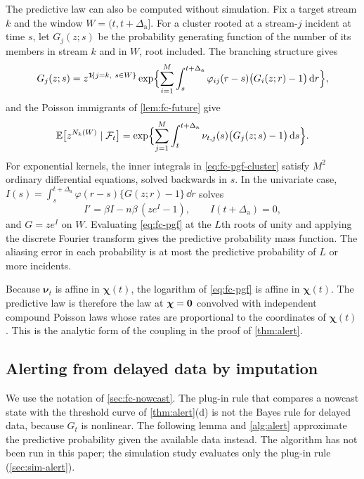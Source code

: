 \begin{remark}\label{rem:fc-pgf}
The predictive law can also be computed without simulation. Fix a target stream $k$
and the window $W=(t,t+\Delta_{\mathrm a}]$. For a cluster rooted at a stream-$j$ incident at time
$s$, let $G_j(z;s)$ be the probability generating function of the number of its members
in stream $k$ and in $W$, root included. The branching structure gives
\begin{equation}\label{eq:fc-pgf-cluster}
  G_j(z;s)=z^{\mathbf{1}\!\left\{j=k,\ s\in W\right\}}\exp\Bigl\{\sum_{i=1}^{M}\int_s^{t+\Delta_{\mathrm a}}\varphi_{ij}(r-s)\bigl(G_i(z;r)-1\bigr)\,\mathrm{d} r\Bigr\},
\end{equation}
and the Poisson immigrants of \cref{lem:fc-future} give
\begin{equation}\label{eq:fc-pgf}
  \mathbb{E}\bigl[z^{N_k(W)}\mid\mathcal{F}_t\bigr]
  =\exp\Bigl\{\sum_{j=1}^{M}\int_t^{t+\Delta_{\mathrm a}}\nu_{t,j}(s)\bigl(G_j(z;s)-1\bigr)\,\mathrm{d} s\Bigr\}.
\end{equation}
For exponential kernels, the inner integrals in \eqref{eq:fc-pgf-cluster} satisfy $M^2$
ordinary differential equations, solved backwards in $s$. In the univariate case,
$I(s)=\int_s^{t+\Delta_{\mathrm a}}\varphi(r-s)\{G(z;r)-1\}\,\dd r$ solves
\[
I'=\beta I-n\beta\,(ze^{I}-1),\qquad I(t+\Delta_{\mathrm a})=0,
\]
and $G=ze^{I}$ on $W$. Evaluating \eqref{eq:fc-pgf} at the $L$th roots of unity and
applying the discrete Fourier transform gives the predictive probability mass function.
The aliasing error in each probability is at most the predictive probability of $L$ or
more incidents.

Because $\bm\nu_t$ is affine in $\bm\chi(t)$, the logarithm of \eqref{eq:fc-pgf} is
affine in $\bm\chi(t)$. The predictive law is therefore the law at $\bm\chi=\mathbf{0}$
convolved with independent compound Poisson laws whose rates are proportional to the
coordinates of $\bm\chi(t)$. This is the analytic form of the coupling in the proof of
\cref{thm:alert}.
\end{remark}

\subsection{Alerting from delayed data by imputation}\label{app:fc-sis}

We use the notation of \cref{sec:fc-nowcast}. The plug-in rule that compares a nowcast
state with the threshold curve of \cref{thm:alert}(d) is not the Bayes rule for delayed
data, because $G_t$ is nonlinear. The following lemma and \cref{alg:alert} approximate
the predictive probability given the available data instead. The algorithm has not been run
in this paper; the simulation study evaluates only the plug-in rule (\cref{sec:sim-alert}).

